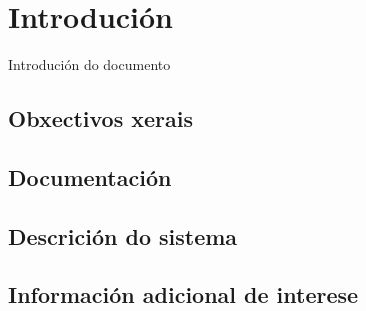 \chapter{Introdución}


Introdución do documento

\section{Obxectivos xerais}

\section{Documentación}

\section{Descrición do sistema}

\section{Información adicional de interese}
